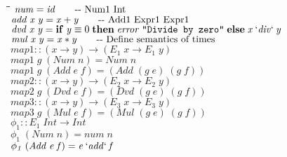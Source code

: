 \documentclass[10pt]{article}
\newlength{\lwidth}\setlength{\lwidth}{4.5cm}
\newlength{\cwidth}\setlength{\cwidth}{8mm} %
\newcommand{\Conid}[1]{\mathit{#1}}
\newcommand{\Varid}[1]{\mathit{#1}}
\begin{document}
\begin{tabbing}
\qquad\=\hspace{\lwidth}\=\hspace{\cwidth}\=\+\kill
${\Varid{num}\mathrel{=}\Varid{id}\mbox{\qquad-{}-  Num1 Int}}$\\
${\Varid{add}\;\Varid{x}\;\Varid{y}\mathrel{=}\Varid{x}\mathbin{+}\Varid{y}\mbox{\qquad-{}-  Add1 Expr1 Expr1}}$\\
${\Varid{dvd}\;\Varid{x}\;\Varid{y}\mathrel{=}\mathbf{if}\;\Varid{y}\equiv \mathrm{0}\;\mathbf{then}\;\Varid{error}\;\text{\tt \char34 Divide~by~zero\char34}\;\mathbf{else}\;\Varid{x}\mathbin{\Varid{`div`}}\Varid{y}}$\\
${\Varid{mul}\;\Varid{x}\;\Varid{y}\mathrel{=}\Varid{x}\mathbin{*}\Varid{y}\mbox{\qquad-{}-  Define semantics of times}}$\\
${}$\\
${\Varid{map1}\mathbin{::}(\Varid{x}\to \Varid{y})\to (\Varid{E}_1\;\Varid{x}\to \Varid{E}_1\;\Varid{y})}$\\
${\Varid{map1}\;\Varid{g}\;(\Conid{Num}\;\Varid{n})\mathrel{=}\Conid{Num}\;\Varid{n}}$\\
${\Varid{map1}\;\Varid{g}\;(\Conid{Add}\;\Varid{e}\;\Varid{f})\mathrel{=}(\Conid{Add}\;(\Varid{g}\;\Varid{e})\;(\Varid{g}\;\Varid{f}))}$\\
${}$\\
${\Varid{map2}\mathbin{::}(\Varid{x}\to \Varid{y})\to (\Varid{E}_2\;\Varid{x}\to \Varid{E}_2\;\Varid{y})}$\\
${\Varid{map2}\;\Varid{g}\;(\Conid{Dvd}\;\Varid{e}\;\Varid{f})\mathrel{=}(\Conid{Dvd}\;(\Varid{g}\;\Varid{e})\;(\Varid{g}\;\Varid{f}))}$\\
${}$\\
${\Varid{map3}\mathbin{::}(\Varid{x}\to \Varid{y})\to (\Varid{E}_3\;\Varid{x}\to \Varid{E}_3\;\Varid{y})}$\\
${\Varid{map3}\;\Varid{g}\;(\Conid{Mul}\;\Varid{e}\;\Varid{f})\mathrel{=}(\Conid{Mul}\;(\Varid{g}\;\Varid{e})\;(\Varid{g}\;\Varid{f}))}$\\
${}$\\
${\Varid{\phi_1}\mathbin{::}\Varid{E}_1\;\Conid{Int}\to \Conid{Int}}$\\
${\Varid{\phi_1}\;(\Conid{Num}\;\Varid{n})\mathrel{=}\Varid{num}\;\Varid{n}}$\\
${\Varid{\phi_1}\;(\Conid{Add}\;\Varid{e}\;\Varid{f})\mathrel{=}\Varid{e}\mathbin{`\Varid{add}`}\Varid{f}}$\\
${}$\\

\end{tabbing}
\end{document}
